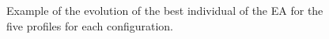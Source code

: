 \documentclass{sig-alternate}
\begin{document}
\begin{figure}[htb]
\centering

\caption{Example of the evolution of the best individual of the EA for the five
  profiles for each configuration.}

\label{fig:boxplots}
\end{figure}
\end{document}
